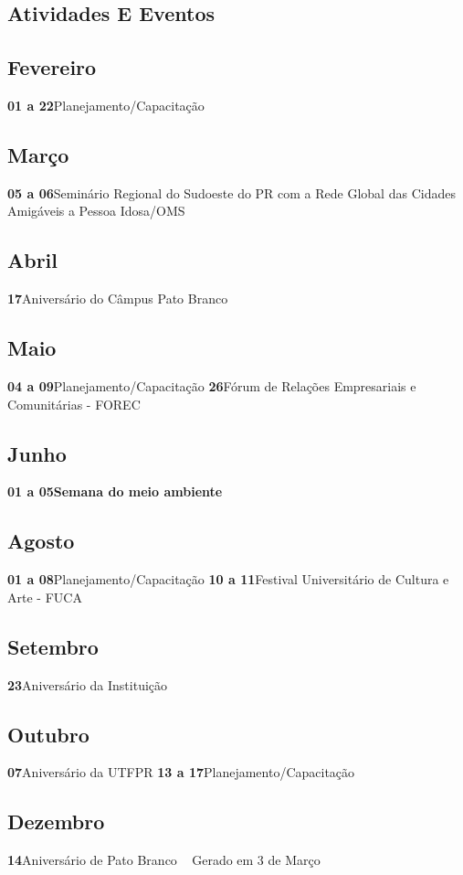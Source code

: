 \documentclass[thesis]{hmcposter}
\begin{document}
\begin{poster}
\normalsize \section{\color{hmcorange}Atividades E Eventos}\subsection{Fevereiro}\textbf{01 a 22}\quad \quad Planejamento/Capacitação \newline\subsection{Março}\textbf{05 a 06}\quad \quad Seminário Regional do Sudoeste do PR com a Rede Global das Cidades Amigáveis a Pessoa Idosa/OMS \newline\subsection{Abril}\textbf{17}\quad \quad \quad \quad Aniversário do Câmpus Pato Branco \newline\subsection{Maio}\textbf{04 a 09}\quad \quad Planejamento/Capacitação \newline\textbf{26}\quad \quad \quad \quad Fórum de Relações Empresariais e Comunitárias - FOREC \newline\subsection{Junho}\textbf{01 a 05}\quad \quad \textbf{Semana do meio ambiente} \newline\subsection{Agosto}\textbf{01 a 08}\quad \quad Planejamento/Capacitação \newline\textbf{10 a 11}\quad \quad Festival Universitário de Cultura e Arte - FUCA \newline\subsection{Setembro}\textbf{23}\quad \quad \quad \quad Aniversário da Instituição \newline\subsection{Outubro}\textbf{07}\quad \quad \quad \quad Aniversário da UTFPR \newline\textbf{13 a 17}\quad \quad Planejamento/Capacitação \newline\subsection{Dezembro}\textbf{14}\quad \quad \quad \quad Aniversário de Pato Branco \newline ~ \vfill \hfill \small \color{hmcorange}Gerado em 3 de Março \end{poster}
\end{document}
